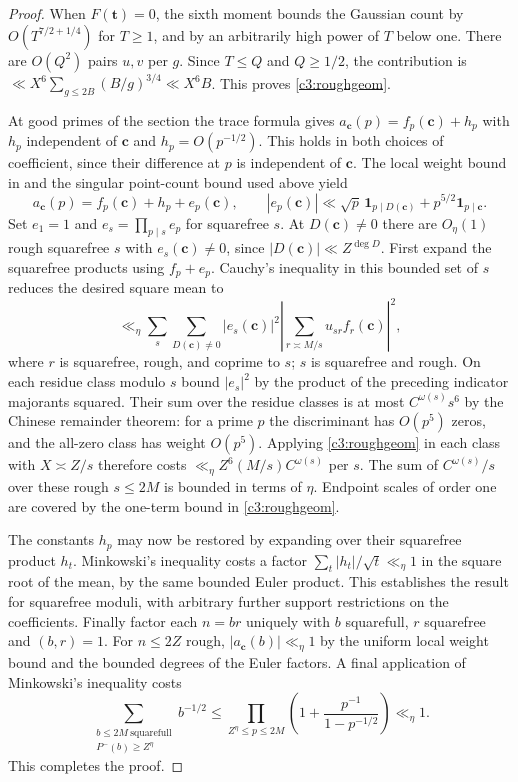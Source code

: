 \documentclass[11pt,letterpaper]{article}
\theoremstyle{definition}
\begin{document}
\begin{proof}
When $F(\mathbf t)=0$, the sixth moment bounds the Gaussian count
by $O(T^{7/2+1/4})$ for $T\ge1$, and by an arbitrarily high power
of $T$ below one. There are $O(Q^2)$ pairs $u,v$ per $g$. Since
$T\le Q$ and $Q\ge1/2$, the contribution is
$\ll X^6\sum_{g\le2B}(B/g)^{3/4}\ll X^6B$.
This proves \eqref{c3:roughgeom}.

At good primes of the section the trace formula gives
$a_{\mathbf c}(p)=f_p(\mathbf c)+h_p$ with $h_p$ independent of
$\mathbf c$ and $h_p=O(p^{-1/2})$. This holds in both choices
of coefficient, since their difference at $p$ is independent
of $\mathbf c$. The local weight bound in \cite[(3.2)--(3.3)]{c3:wang}
and the singular point-count bound used above yield
\[
 a_{\mathbf c}(p)=f_p(\mathbf c)+h_p+e_p(\mathbf c),\qquad
 |e_p(\mathbf c)|\ll \sqrt p\,\mathbf1_{p\mid D(\mathbf c)}
                       +p^{5/2}\mathbf1_{p\mid\mathbf c}.
\]
Set $e_1=1$ and $e_s=\prod_{p\mid s}e_p$ for squarefree $s$.
At $D(\mathbf c)\ne0$ there are $O_\eta(1)$ rough squarefree
$s$ with $e_s(\mathbf c)\ne0$, since
$|D(\mathbf c)|\ll Z^{\deg D}$. First expand the squarefree
products using $f_p+e_p$. Cauchy's inequality in this bounded
set of $s$ reduces the desired square mean to
\[
 \ll_\eta\sum_{s}\sum_{D(\mathbf c)\ne0}|e_s(\mathbf c)|^2
   \left|\sum_{r\asymp M/s} u_{sr}f_r(\mathbf c)\right|^2 ,
\]
where $r$ is squarefree, rough, and coprime to $s$; $s$ is squarefree
and rough. On each residue class modulo $s$ bound $|e_s|^2$ by the
product of the preceding indicator majorants squared. Their sum over
the residue classes is at most $C^{\omega(s)}s^6$ by the Chinese
remainder theorem: for a prime $p$ the discriminant has $O(p^5)$
zeros, and the all-zero class has weight $O(p^5)$. Applying
\eqref{c3:roughgeom} in each class with $X\asymp Z/s$ therefore costs
$\ll_\eta Z^6 (M/s) C^{\omega(s)}$ per $s$. The sum of
$C^{\omega(s)}/s$ over these rough $s\le2M$ is bounded in terms
of $\eta$. Endpoint scales of order one are covered by the
one-term bound in \eqref{c3:roughgeom}.

The constants $h_p$ may now be restored by expanding over their
squarefree product $h_t$. Minkowski's inequality costs a factor
$\sum_t|h_t|/\sqrt t\ll_\eta1$ in the square root of the mean,
by the same bounded Euler product. This establishes the result for
squarefree moduli, with arbitrary further support restrictions on
the coefficients. Finally factor each $n=br$ uniquely with $b$
squarefull, $r$ squarefree and $(b,r)=1$. For $n\le2Z$ rough,
$|a_{\mathbf c}(b)|\ll_\eta1$ by the uniform local weight bound
and the bounded degrees of the Euler factors. A final application
of Minkowski's inequality costs
\[
 \sum_{\substack{b\le2M\ \text{squarefull}\\P^-(b)\ge Z^\eta}}
 b^{-1/2}\le
 \prod_{Z^\eta\le p\le 2M}
 \left(1+\frac{p^{-1}}{1-p^{-1/2}}\right)\ll_\eta1 .
\]
This completes the proof.
\end{proof}
\end{document}
